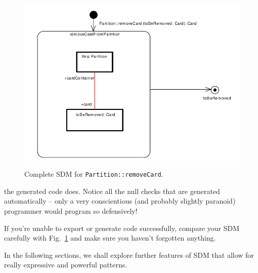 \begin{figure}[htbp]
\begin{center}
  \includegraphics[width=\textwidth]{pics/sdmBilder/removeCard/sdm15}
  \caption{Complete SDM for \texttt{Partition::removeCard}.}  
  \label{fig:sdm_complete_control_flow}
\end{center}
\end{figure}


the generated code does.  Notice all the null checks that are generated
automatically -- only a very conscientious (and probably slightly paranoid)
programmer would program so defensively!

If you're unable to export or generate code successfully, compare your SDM
carefully with Fig.~\ref{fig:sdm_complete_control_flow} and make sure you
haven't forgotten anything.

In the following sections, we shall explore further features of SDM that
allow for really expressive and powerful patterns.
